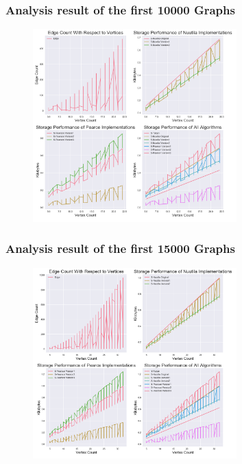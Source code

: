 \documentclass{beamer}
\begin{document}
			\begin{frame}
				\frametitle{Analysis result of the first 10000 Graphs}
					\begin{figure}[h!]
					\centering
					\includegraphics[width=0.7\textwidth]{S10000}
				\end{figure}
			\end{frame}
			\begin{frame}
				\frametitle{Analysis result of the first 15000 Graphs}
				\begin{figure}[h!]
					\centering
					\includegraphics[width=0.7\textwidth]{S15000}	
				\end{figure}
			\end{frame}
\end{document}
